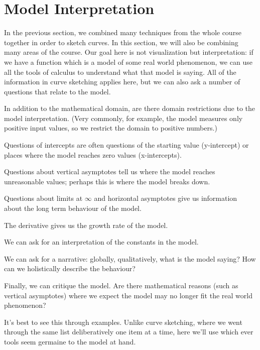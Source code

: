 \documentclass[fleqn]{report}
\begin{document}
\chapter{Model Interpretation}
\label{Model Interpretation}

In the previous section, we combined many techniques from the
whole course together in order to sketch curves. In this
section, we will also be combining many areas of the course.
Our goal here is not visualization but interpretation: if we
have a function which is a model of some real world
phenomenon, we can use all the tools of calculus to understand
what that model is saying. All of the information in curve
sketching applies here, but we can also ask a number of
questions that relate to the model.

\begin{smallitemize}
\item In addition to the mathematical domain, are there domain
restrictions due to the model interpretation. (Very commonly,
for example, the model measures only positive input values, so
we restrict the domain to positive numbers.)
\item Questions of intercepts are often questions of the
starting value (y-intercept) or places where the model reaches
zero values (x-intercepts).
\item Questions about vertical asymptotes tell us where the
model reaches unreasonable values; perhaps this is where the
model breaks down.
\item Questions about limits at $\infty$ and horizontal
asymptotes give us information about the long term behaviour
of the model.
\item The derivative gives us the growth rate of the model.
\item We can ask for an interpretation of the constants in the
model.
\item We can ask for a narrative: globally, qualitatively,
what is the model saying? How can we holistically describe
the behaviour?
\item Finally, we can critique the model. Are there
mathematical reasons (such as vertical asymptotes) where we
expect the model may no longer fit the real world phenomenon?
\end{smallitemize}

It's best to see this through examples. Unlike curve
sketching, where we went through the same list deliberatively
one item at a time, here we'll use which ever tools seem
germaine to the model at hand. 
\end{document}
